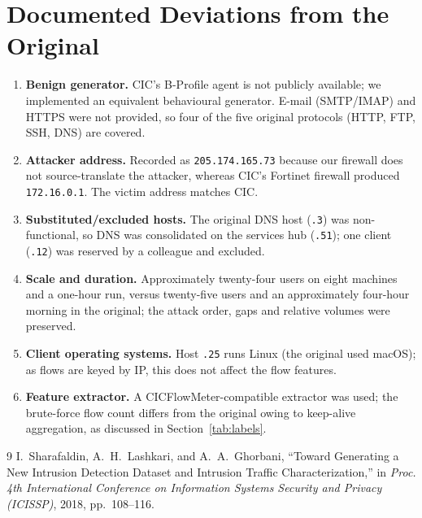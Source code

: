 \documentclass[11pt]{article}
\begin{document}
\section{Documented Deviations from the Original}
\label{sec:dev}
\begin{enumerate}
  \item \textbf{Benign generator.} CIC's B-Profile agent is not publicly
        available; we implemented an equivalent behavioural generator. E-mail
        (SMTP/IMAP) and HTTPS were not provided, so four of the five original
        protocols (HTTP, FTP, SSH, DNS) are covered.
  \item \textbf{Attacker address.} Recorded as \texttt{205.174.165.73} because
        our firewall does not source-translate the attacker, whereas CIC's
        Fortinet firewall produced \texttt{172.16.0.1}. The victim address
        matches CIC.
  \item \textbf{Substituted/excluded hosts.} The original DNS host (\texttt{.3})
        was non-functional, so DNS was consolidated on the services hub
        (\texttt{.51}); one client (\texttt{.12}) was reserved by a colleague and
        excluded.
  \item \textbf{Scale and duration.} Approximately twenty-four users on eight
        machines and a one-hour run, versus twenty-five users and an
        approximately four-hour morning in the original; the attack order, gaps
        and relative volumes were preserved.
  \item \textbf{Client operating systems.} Host \texttt{.25} runs Linux (the
        original used macOS); as flows are keyed by IP, this does not affect the
        flow features.
  \item \textbf{Feature extractor.} A CICFlowMeter-compatible extractor was used;
        the brute-force flow count differs from the original owing to keep-alive
        aggregation, as discussed in Section~\ref{tab:labels}.
\end{enumerate}

\begin{thebibliography}{9}
 I.~Sharafaldin, A.~H.~Lashkari, and A.~A.~Ghorbani,
``Toward Generating a New Intrusion Detection Dataset and Intrusion Traffic
Characterization,'' in \emph{Proc. 4th International Conference on Information
Systems Security and Privacy (ICISSP)}, 2018, pp.~108--116.
\end{thebibliography}
\end{document}
